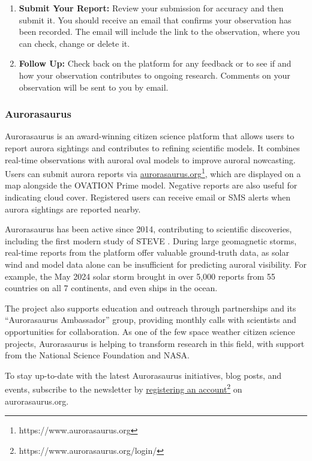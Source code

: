 \documentclass{article}
\renewcommand{\cite}[1]{\parencite{#1}}
\begin{document}
\begin{enumerate}
    \item \textbf{Submit Your Report:} Review your submission for accuracy and then submit it. You should receive an email that confirms your observation has been recorded.  The email will include the link to the observation, where you can check, change or delete it. 
    
    \item \textbf{Follow Up:} Check back on the platform for any feedback or to see if and how your observation contributes to ongoing research. Comments on your observation will be sent to you by email.
\end{enumerate}


\subsubsection{Aurorasaurus}\label{sec:Aurorasaurus}%

Aurorasaurus \cite{MacDonald2015} is an award-winning citizen science platform that allows users to report aurora sightings and contributes to refining scientific models. It combines real-time observations with auroral oval models to improve auroral nowcasting. Users can submit aurora reports via \href{https://www.aurorasaurus.org/}{aurorasaurus.org}\footnote{https://www.aurorasaurus.org}, which are displayed on a map alongside the OVATION Prime model. Negative reports are also useful for indicating cloud cover. Registered users can receive email or SMS alerts when aurora sightings are reported nearby.

Aurorasaurus has been active since 2014, contributing to scientific discoveries, including the first modern study of STEVE \cite{MacDonald2018}. During large geomagnetic storms, real-time reports from the platform offer valuable ground-truth data, as solar wind and model data alone can be insufficient for predicting auroral visibility. For example, the May 2024 solar storm brought in over 5,000 reports from 55 countries on all 7 continents, and even ships in the ocean.

The project also supports education and outreach through partnerships and its ``Aurorasaurus Ambassador'' group, providing monthly calls with scientists and opportunities for collaboration. As one of the few space weather citizen science projects, Aurorasaurus is helping to transform research in this field, with support from the National Science Foundation and NASA.

To stay up-to-date with the latest Aurorasaurus initiatives, blog posts, and events, subscribe to the newsletter by \href{https://www.aurorasaurus.org/login/}{registering an account}\footnote{https://www.aurorasaurus.org/login/} on aurorasaurus.org.
\end{document}
